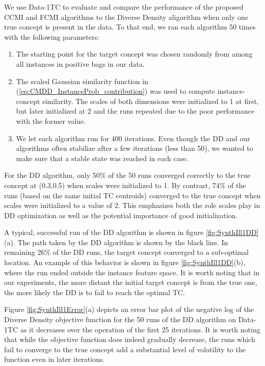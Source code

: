 \documentclass[12pt,dvips]{report}
\numberwithin{equation}{section}
\begin{document}
We use Data-1TC to evaluate and compare the performance of the proposed CCMI and FCMI algorithms to the Diverse Density aligorithm \cite{maro98} when only one true concept is present in the data.  To that end, we ran each algorithm 50 times with the following parameters:
\begin{enumerate}
  \item The starting point for the target concept was chosen randomly from among all instances in positive bags in our data.
  \item The scaled Gaussian similarity function in (\ref{eq:CMDD_InstanceProb_contribution}) was used to compute instance-concept similarity.  The scales of both dimensions were initialized to 1 at first, but later initialized at 2 and the runs repeated due to the poor performance with the former value.  
  \item We let each algorithm run for 400 iterations.  Even though the DD and our algorithms often stabilize after a few iterations (less than 50), we wanted to make sure that a stable state was reached in each case.
\end{enumerate}  

For the DD algorithm, only 50\% of the 50 runs converged correctly to the true concept at (0.3,0.5) when scales were initialized to 1.  By contrast, 74\% of the runs (based on the same initial TC centroids) converged to the true concept when scales were initialized to a value of 2.  This emphasizes both the role scales play in DD optimization as well as the potential importance of good initialization.

A typical, successful run of the DD algorithm is shown in figure \ref{fig:SynthIll1DD}(a).  The path taken by the DD algorithm is shown by the black line.   In remaining 26\% of the DD runs, the target concept converged to a sub-optimal location.  An example of this behavior is shown in figure \ref{fig:SynthIll1DD}(b), where the run ended outside the instance feature space.  It is worth noting that in our experiments, the more distant the initial target concept is from the true one, the more likely the DD is to fail to reach the optimal TC.

Figure \ref{fig:SynthIll1Error}(a) depicts an error bar plot of the negative log of the Diverse Density objective function for the 50 runs of the DD algorithm on Data-1TC as it decreases over the operation of the first 25 iterations.  It is worth noting that while the objective function does indeed gradually decrease, the runs which fail to converge to the true concept add a substantial level of volatility to the function even in later iterations.
\end{document}
